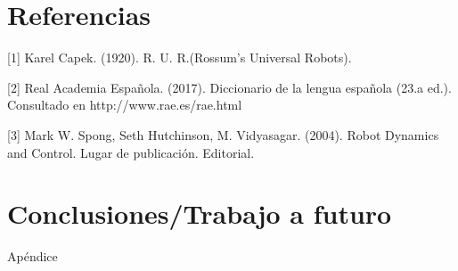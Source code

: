 \chapter{Referencias}

[1] Karel Capek. (1920). R. U. R.(Rossum's Universal Robots).

[2] Real Academia Española. (2017). Diccionario de la lengua española (23.a ed.). Consultado en http://www.rae.es/rae.html

[3] Mark W. Spong, Seth Hutchinson, M. Vidyasagar. (2004). Robot Dynamics and Control. Lugar de publicación. Editorial.

\chapter{Conclusiones/Trabajo a futuro}

Apéndice
